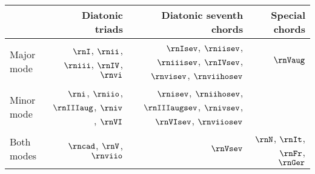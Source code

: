 \begin{tabular}{l|r|r|r}
            & Diatonic triads                                & Diatonic seventh chords                                                       & Special chords        \\
\hline
Major mode & $\rnI$, $\rnii$, $\rniii$, $\rnIV$, $\rnvi$     & $\rnIsev$, $\rniisev$, $\rniiisev$, $\rnIVsev$, $\rnvisev$, $\rnviihosev$     & $\rnVaug$                \\
Minor mode & $\rni$, $\rniio$, $\rnIIIaug$, $\rniv$, $\rnVI$ & $\rnisev$, $\rniihosev$, $\rnIIIaugsev$, $\rnivsev$, $\rnVIsev$, $\rnviiosev$ &                       \\
Both modes & $\rncad$, $\rnV$, $\rnviio$                     & $\rnVsev$                                                                     & $\rnN$, $\rnIt$, $\rnFr$, $\rnGer$
\end{tabular}
